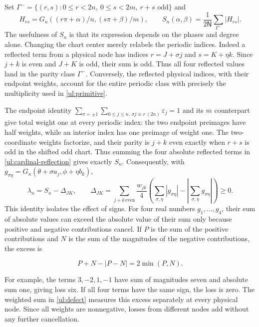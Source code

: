 Set $\Gamma^-=\{(r,s):0\leq r<2n,\ 0\leq s<2m,\ r+s\text{ odd}\}$ and
\begin{equation}\label{ul:primitive}
 H_{rs}=G_n((r\pi+\alpha)/n,(s\pi+\beta)/m),\qquad
 S_n(\alpha,\beta)=\frac1{2\mathsf N}\sum_{\Gamma^-}|H_{rs}|.
\end{equation}
The usefulness of $S_n$ is that its expression depends on the phases
and degree alone.  Changing the chart center merely relabels the
periodic indices.  Indeed a reflected term from a physical node has
indices $r=J+\sigma j$ and $s=K+\eta k$.  Since $j+k$ is even
and $J+K$ is odd, their sum is odd.  Thus all four reflected values
land in the parity class $\Gamma^-$.  Conversely, the reflected
physical indices, with their endpoint weights, account for the entire
periodic class with precisely the multiplicity used in
\eqref{ul:primitive}.

The endpoint identity
$\sum_{\sigma=\pm1}\sum_{0\leq j\leq n,\,\sigma j\equiv r\ (2n)}\varepsilon_j=1$
and its $m$ counterpart give total weight one at every periodic
index: the two endpoint preimages have half weights, while an interior
index has one preimage of weight one. The two-coordinate weights
factorize, and their parity is $j+k$ even exactly when $r+s$ is odd
in the shifted odd chart. Thus summing the four absolute reflected
terms in \eqref{ul:cardinal-reflection} gives exactly $S_n$.
Consequently, with $g_{\sigma\eta}=G_n(\theta+\sigma a_j,\phi+\eta b_k)$,
\begin{equation}\label{ul:defect}
 \lambda_n=S_n-\Delta_{JK},\qquad
 \Delta_{JK}=\sum_{j+k\,\mathrm{even}}\frac{w_{jk}}4
 \left(\sum_{\sigma,\eta}|g_{\sigma\eta}|
             -\left|\sum_{\sigma,\eta}g_{\sigma\eta}\right|\right)\geq0.
\end{equation}
This identity isolates the effect of signs.  For four real numbers
$g_1,\ldots,g_4$, their sum of absolute values can exceed the absolute
value of their sum only because positive and negative contributions
cancel.  If $P$ is the sum of the positive contributions and $N$ is
the sum of the magnitudes of the negative contributions, the excess is

\[
 P+N-|P-N|=2\min(P,N).
\]

For example, the terms $3,-2,1,-1$ have sum of magnitudes seven and
absolute sum one, giving loss six.  If all four terms have the same
sign, the loss is zero.  The weighted sum in \eqref{ul:defect}
measures this excess separately at every physical node.  Since all
weights are nonnegative, losses from different nodes add without any
further cancellation.

